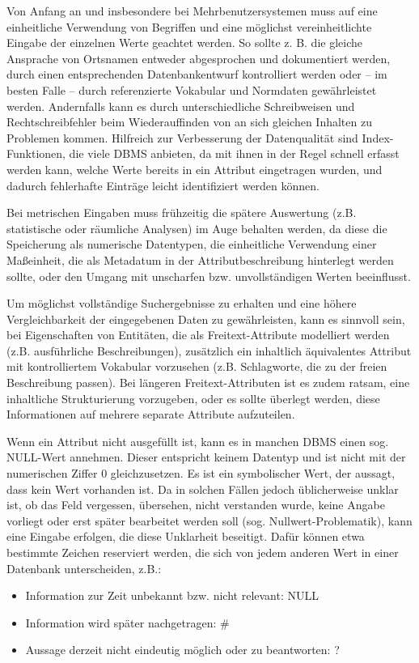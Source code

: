 Von Anfang an und insbesondere bei Mehrbenutzersystemen muss auf eine einheitliche Verwendung von Begriffen und eine möglichst vereinheitlichte Eingabe der einzelnen Werte geachtet werden. So sollte z. B. die gleiche Ansprache von Ortsnamen entweder abgesprochen und dokumentiert werden, durch einen entsprechenden Datenbankentwurf kontrolliert werden oder -- im besten Falle -- durch referenzierte Vokabular und Normdaten gewährleistet werden. Andernfalls kann es durch unterschiedliche Schreibweisen und Rechtschreibfehler beim Wiederauffinden von an sich gleichen Inhalten zu Problemen kommen. Hilfreich zur Verbesserung der Datenqualität sind Index-Funktionen, die viele DBMS anbieten, da mit ihnen in der Regel schnell erfasst werden kann, welche Werte bereits in ein Attribut eingetragen wurden, und dadurch fehlerhafte Einträge leicht identifiziert werden können.

Bei metrischen Eingaben muss frühzeitig die spätere Auswertung (z.B. statistische oder räumliche Analysen) im Auge behalten werden, da diese die Speicherung als numerische Datentypen, die einheitliche Verwendung einer Maßeinheit, die als Metadatum in der Attributbeschreibung hinterlegt werden sollte, oder den Umgang mit unscharfen bzw. unvollständigen Werten beeinflusst.

Um möglichst vollständige Suchergebnisse zu erhalten und eine höhere Vergleichbarkeit der eingegebenen Daten zu gewährleisten, kann es sinnvoll sein, bei Eigenschaften von Entitäten, die als Freitext-Attribute modelliert werden (z.B. ausführliche Beschreibungen), zusätzlich ein inhaltlich äquivalentes Attribut mit kontrolliertem Vokabular vorzusehen (z.B. Schlagworte, die zu der freien Beschreibung passen). Bei längeren Freitext-Attributen ist es zudem ratsam, eine inhaltliche Strukturierung vorzugeben, oder es sollte überlegt werden, diese Informationen auf mehrere separate Attribute aufzuteilen.

Wenn ein Attribut nicht ausgefüllt ist, kann es in manchen DBMS einen sog. NULL-Wert annehmen. Dieser entspricht keinem Datentyp und ist nicht mit der numerischen Ziffer 0 gleichzusetzen. Es ist ein symbolischer Wert, der aussagt, dass kein Wert vorhanden ist. Da in solchen Fällen jedoch üblicherweise unklar ist, ob das Feld vergessen, übersehen, nicht verstanden wurde, keine Angabe vorliegt oder erst später bearbeitet werden soll (sog. Nullwert-Problematik), kann eine Eingabe erfolgen, die diese Unklarheit beseitigt. Dafür können etwa bestimmte Zeichen reserviert werden, die sich von jedem anderen Wert in einer Datenbank unterscheiden, z.B.:
\begin{itemize}
	\item Information zur Zeit unbekannt bzw. nicht relevant: NULL
	\item Information wird später nachgetragen: \#
	\item Aussage derzeit nicht eindeutig möglich oder zu beantworten: ?
\end{itemize}


